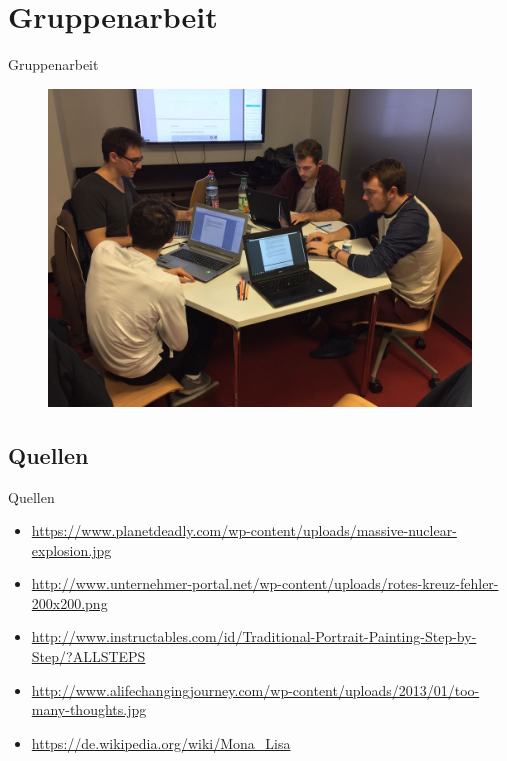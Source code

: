 \documentclass[19pt]{beamer}
\begin{document}
\section{Gruppenarbeit}
\begin{frame}{Gruppenarbeit}
	\begin{figure}
		\begin{center}
			\includegraphics[scale=0.16]{resources/Gruppenarbeit} 
		\end{center}
	\end{figure}	 
\end{frame}

\subsection{Quellen}
\begin{frame}{Quellen}
	\begin{itemize}
		\item \url{https://www.planetdeadly.com/wp-content/uploads/massive-nuclear-explosion.jpg}
		\item \url{http://www.unternehmer-portal.net/wp-content/uploads/rotes-kreuz-fehler-200x200.png}
		\item \url{http://www.instructables.com/id/Traditional-Portrait-Painting-Step-by-Step/?ALLSTEPS}
		\item \url{http://www.alifechangingjourney.com/wp-content/uploads/2013/01/too-many-thoughts.jpg}
		\item \url{https://de.wikipedia.org/wiki/Mona_Lisa}
	\end{itemize}	
\end{frame}
\end{document}
